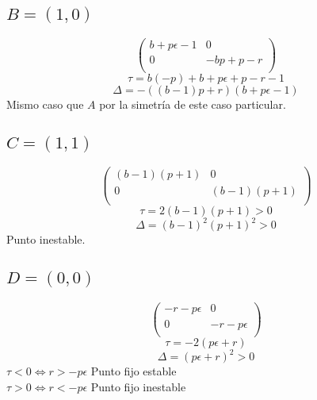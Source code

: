 \documentclass[11pt]{article}
\begin{document}
\subsection*{$B=(1,0)$}
\begin{equation}
\left(
\begin{array}{cc}
 b+p \epsilon -1 & 0 \\
 0 & -b p+p-r \\
\end{array}
\right)
\end{equation}
\begin{equation}
\tau=b (-p)+b+p \epsilon +p-r-1
\end{equation}
\begin{equation}
\Delta=-((b-1) p+r) (b+p \epsilon -1)
\end{equation}
Mismo caso que $A$ por la simetría de este caso particular.

\subsection*{$C=(1,1)$}
\begin{equation*}
\left(
\begin{array}{cc}
 (b-1) (p+1) & 0 \\
 0 & (b-1) (p+1) \\
\end{array}
\right)
\end{equation*}
\begin{equation*}
\tau=2 (b-1) (p+1)>0
\end{equation*}
\begin{equation*}
\Delta=(b-1)^2 (p+1)^2>0
\end{equation*}
Punto inestable.

\subsection*{$D=(0,0)$}
\begin{equation*}
\left(
\begin{array}{cc}
 -r-p \epsilon  & 0 \\
 0 & -r-p \epsilon  \\
\end{array}
\right)
\end{equation*}
\begin{equation*}
\tau=-2 (p \epsilon +r)
\end{equation*}
\begin{equation*}
\Delta=(p \epsilon +r)^2>0
\end{equation*}
$\tau<0\Longleftrightarrow r>-p\epsilon$ Punto fijo estable\\
$\tau>0\Longleftrightarrow r<-p\epsilon$ Punto fijo inestable\\
\end{document}
